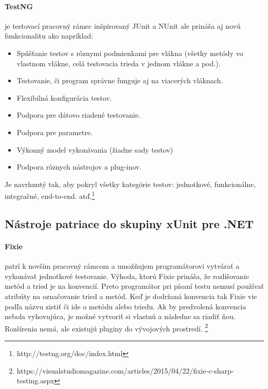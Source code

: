 \documentclass[11pt,twoside,slovak,a4paper]{article}
\begin{document}
	\paragraph{TestNG} je testovací pracovný rámec inšpirovaný JUnit a NUnit ale prináša aj novú funkcionalitu ako napríklad:
	\begin{itemize}
		\item Spúšťanie testov s rôznymi podmienkami pre vlákna (všetky metódy vo vlastnom vlákne, celá testovacia trieda v jednom vlákne a pod.).
		\item Testovanie, či program správne funguje aj na viacerých vláknach.
		\item Flexibilná konfigurácia testov.
		\item Podpora pre dátovo riadené testovanie.
		\item Podpora pre parametre.
		\item Výkonný model vykonávania (žiadne sady testov)
		\item Podpora rôznych nástrojov a plug-inov.
	\end{itemize}
	
	Je navrhnutý tak, aby pokryl všetky kategórie testov: jednotkové, funkcionálne, integračné, end-to-end. atď.\footnote{http://testng.org/doc/index.html}

		\subsection{Nástroje patriace do skupiny xUnit pre .NET}
			
			\paragraph{Fixie} patrí k novším pracovný rámcom a umožňujem programátorovi vytvárať a vykonávať jednotkové testovanie. Výhoda, ktorú Fixie prináša, že rozlišovanie metód a tried je na konvencií. Preto programátor pri písaní testu nemusí používať atribúty na označovanie tried a metód. Keď je dodržaná konvencia tak Fixie vie podľa názvu zistiť či ide o metódu alebo triedu. Ak by predvolená konvencia nebola vyhovujúca, je možné vytvoriť si vlastnú a následne sa riadiť ňou. Rozšírenia nemá, ale existujú pluginy do vývojových prostredí.  \footnote{https://visualstudiomagazine.com/articles/2015/04/22/fixie-c-sharp-testing.aspx}
			
\end{document}
